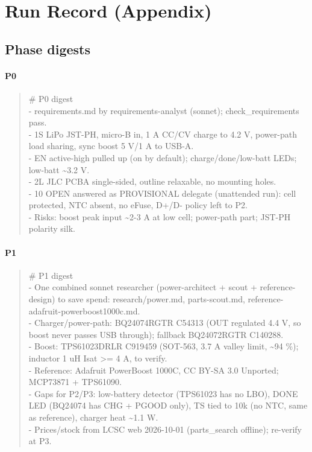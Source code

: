 \documentclass[11pt]{article}
\begin{document}
\section{Run Record (Appendix)}
\subsection*{Phase digests}
\paragraph*{P0}
\begin{quote}\small\ttfamily\raggedright
\# P0 digest\\
- requirements.md by requirements-analyst (sonnet); check\_requirements pass.\\
- 1S LiPo JST-PH, micro-B in, 1 A CC/CV charge to 4.2 V, power-path load sharing, sync boost 5 V/1 A to USB-A.\\
- EN active-high pulled up (on by default); charge/done/low-batt LEDs; low-batt \textasciitilde{}3.2 V.\\
- 2L JLC PCBA single-sided, outline relaxable, no mounting holes.\\
- 10 OPEN answered as PROVISIONAL delegate (unattended run): cell protected, NTC absent, no eFuse, D+/D- policy left to P2.\\
- Risks: boost peak input \textasciitilde{}2-3 A at low cell; power-path part; JST-PH polarity silk.
\end{quote}
\paragraph*{P1}
\begin{quote}\small\ttfamily\raggedright
\# P1 digest\\
- One combined sonnet researcher (power-architect + scout + reference-design) to save spend: research/power.md, parts-scout.md, reference-adafruit-powerboost1000c.md.\\
- Charger/power-path: BQ24074RGTR C54313 (OUT regulated 4.4 V, so boost never passes USB through); fallback BQ24072RGTR C140288.\\
- Boost: TPS61023DRLR C919459 (SOT-563, 3.7 A valley limit, \textasciitilde{}94 \%); inductor 1 uH Isat \textgreater{}= 4 A, to verify.\\
- Reference: Adafruit PowerBoost 1000C, CC BY-SA 3.0 Unported; MCP73871 + TPS61090.\\
- Gaps for P2/P3: low-battery detector (TPS61023 has no LBO), DONE LED (BQ24074 has CHG + PGOOD only), TS tied to 10k (no NTC, same as reference), charger heat \textasciitilde{}1.1 W.\\
- Prices/stock from LCSC web 2026-10-01 (parts\_search offline); re-verify at P3.
\end{quote}
\end{document}
